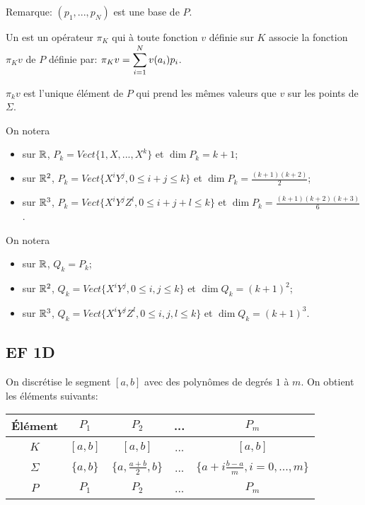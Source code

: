 \medskip
Remarque: $(p_1,..., p_N)$ est une base de $P$.

\medskip
\begin{definition}
Un  est un opérateur $\pi_K$
qui à toute fonction $v$ définie sur $K$ associe la fonction $\pi_Kv$ de $P$ définie par:
$\pi_Kv=\displaystyle\sum_{i=1}^N v(a_i)p_i$.
\end{definition}

\begin{theoreme}
$\pi_kv$ est l'unique élément de $P$ qui prend les mêmes valeurs que $v$ sur les
points de $\Sigma$.
\end{theoreme}

\medskip
On notera 
\begin{itemize}
   \item sur $\mathbb R$, $P_k=Vect\{1, X, ..., X^k\}$ et $\dim P_k=k+1$;
   \item sur $\mathbb R^2$, $P_k=Vect\{X^iY^j, 0\le i+j\le k\}$ et $\dim P_k=\frac{(k+1)(k+2)}2$;
   \item sur $\mathbb R^3$, $P_k=Vect\{X^iY^jZ^l, 0\le i+j+l\le k\}$ et $\dim P_k=\frac{(k+1)(k+2)(k+3)}6$.
\end{itemize}

\medskip
On notera 
\begin{itemize}
   \item sur $\mathbb R$, $Q_k=P_k$;
   \item sur $\mathbb R^2$, $Q_k=Vect\{X^iY^j, 0\le i,j\le k\}$ et $\dim Q_k=(k+1)^2$;
   \item sur $\mathbb R^3$, $Q_k=Vect\{X^iY^jZ^l, 0\le i,j,l\le k\}$ et $\dim Q_k=(k+1)^3$.
\end{itemize}



\medskip
\subsection*{EF 1D}

On discrétise le segment $[a,b]$ avec des polynômes de degrés $1$ à $m$.
On obtient les éléments suivants:
\begin{center}
\begin{tabular}{c|cccc}
Élément & $P_1$ & $P_2$ & ... & $P_m$\\
\hline
$K$	      & $[a,b]$ &  $[a,b]$ & ... & $[a,b]$\\
$\Sigma$   & $\{a,b\}$ & $\{a,\frac{a+b}2, b\}$& ... &$\{a+i\frac{b-a}m, i=0, ..., m\}$\\
$P$            & $P_1$ & $P_2$ & ... & $P_m$\\
\hline
\end{tabular}
\end{center}

